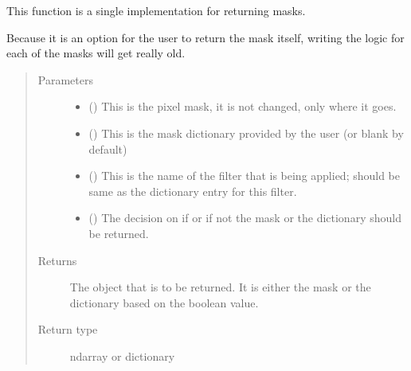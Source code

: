 \documentclass[letterpaper,10pt,english]{sphinxmanual}
\begin{document}
\begin{fulllineitems}
\label{\detokenize{python_docstrings/IfA_Smeargle.echo.echo_functions:IfA_Smeargle.echo.echo_functions.echo_functioned_mask_returning}}
This function is a single implementation for returning masks.

Because it is an option for the user to return the mask itself, writing
the logic for each of the masks will get really old.
\begin{quote}\begin{description}
\item[{Parameters}] \leavevmode\begin{itemize}
\item {} 
 () \textendash{} This is the pixel mask, it is not changed, only where it goes.

\item {} 
 () \textendash{} This is the mask dictionary provided by the user (or blank by default)

\item {} 
 () \textendash{} This is the name of the filter that is being applied; should be same
as the dictionary entry for this filter.

\item {} 
 () \textendash{} The decision on if or if not the mask or the dictionary should be
returned.

\end{itemize}

\item[{Returns}] \leavevmode
{} \textendash{} The object that is to be returned. It is either the mask or the
dictionary based on the boolean value.

\item[{Return type}] \leavevmode
ndarray or dictionary

\end{description}\end{quote}

\end{fulllineitems}
\end{document}
